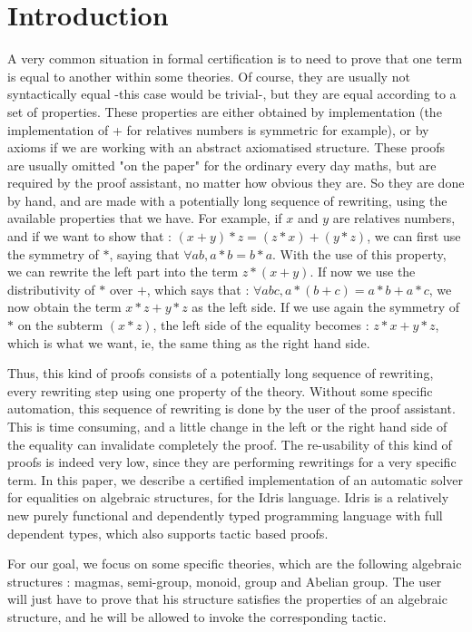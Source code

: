 \section{Introduction}


A very common situation in formal certification is to need to prove that one term is equal to another within some theories. Of course, they are usually not syntactically equal -this case would be trivial-, but they are equal according to a set of properties. These properties are either obtained by implementation (the implementation of + for relatives numbers is symmetric for example), or by axioms if we are working with an abstract axiomatised structure. 
These proofs are usually omitted "on the paper" for the ordinary every day maths, but are required by the proof assistant,  no matter how obvious they are. So they are done by hand, and are made with a potentially long sequence of rewriting, using the available properties that we have. For example, if $x$ and $y$ are relatives numbers, and if we want to show that :
$(x + y) * z = (z * x) + (y * z)$, we can first use the symmetry of $*$, saying that
$\forall a b, a * b = b * a$.
With the use of this property, we can rewrite the left part into the term $z * (x + y)$.
If now we use the distributivity of $*$ over $+$, which says that :
$\forall a b c, a * (b+c) = a*b + a*c$,
we now obtain the term $x*z + y*z$ as the left side.
If we use again the symmetry of $*$ on the subterm $(x*z)$, the left side of the equality becomes : $z*x + y*z$, which is what we want, ie, the same thing as the right hand side.

Thus, this kind of proofs consists of a potentially long sequence of rewriting, every rewriting step using one property of the theory. Without some specific automation, this sequence of rewriting is done by the user of the proof assistant. This is time consuming, and a little change in the left or the right hand side of the equality can invalidate completely the proof. The re-usability of this kind of proofs is indeed very low, since they are performing rewritings for a very specific term. In this paper, we describe a certified implementation of an automatic solver for equalities on algebraic structures, for the Idris language. Idris is a relatively new purely functional and dependently typed programming language with full dependent types, which also supports tactic based proofs. 

For our goal, we focus on some specific theories, which are the following algebraic structures : magmas, semi-group, monoid, group and Abelian group.
The user will just have to prove that his structure satisfies the properties of an algebraic structure, and he will be allowed to invoke the corresponding tactic.

